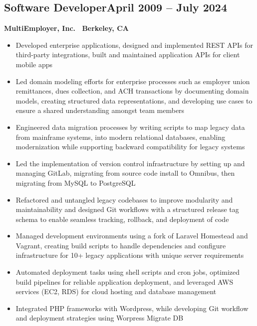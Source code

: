\documentclass[a4paper,10pt]{article}
\begin{document}
\subsection*{Software Developer\hfill April 2009 -- July 2024}
\textbf{MultiEmployer, Inc. \textbar\ Berkeley, CA}
\begin{itemize}[itemsep=0em]
  
  \item Developed enterprise applications, designed and implemented REST APIs for third-party integrations, built and maintained application APIs for client mobile apps
  
  \item Led domain modeling efforts for enterprise processes such as employer union remittances, dues collection, and ACH transactions by documenting domain models, creating structured data representations, and developing use cases to ensure a shared understanding amongst team members
  
  \item Engineered data migration processes by writing scripts to map legacy data from mainframe systems, into modern relational databases, enabling modernization while supporting backward compatibility for legacy systems
  
  \item Led the implementation of version control infrastructure by setting up and managing GitLab, migrating from source code install to Omnibus, then migrating from MySQL to PostgreSQL
  
  \item Refactored and untangled legacy codebases to improve modularity and maintainability and designed Git workflows with a structured release tag schema to enable seamless tracking, rollback, and deployment of code
  
  \item Managed development environments using a fork of Laravel Homestead and Vagrant, creating build scripts to handle dependencies and configure infrastructure for 10+ legacy applications with unique server requirements
  
  \item Automated deployment tasks using shell scripts and cron jobs, optimized build pipelines for reliable application deployment, and leveraged AWS services (EC2, RDS) for cloud hosting and database management
  
  \item Integrated PHP frameworks with Wordpress, while developing Git workflow and deployment strategies using Worpress Migrate DB
  
\end{itemize}
\end{document}
